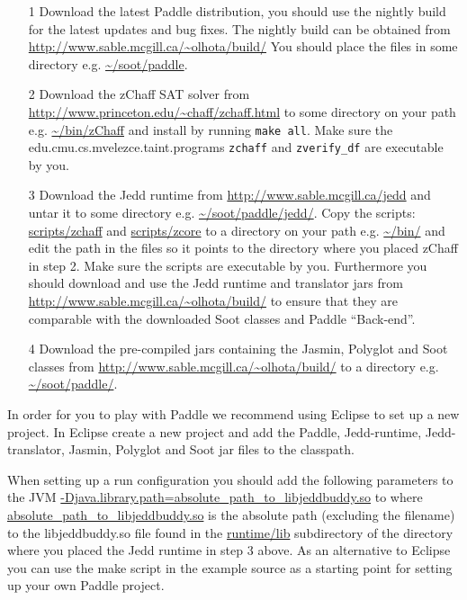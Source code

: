 \documentclass{article}
\newcommand{\code}[1]{\texttt{\small #1}}
\begin{document}
\begin{itemize}

\item[1] Download the latest Paddle distribution, you should use the
nightly build for the latest updates and bug fixes. The nightly build 
can be obtained from \url{http://www.sable.mcgill.ca/~olhota/build/}
You should place the files in some directory
e.g. \url{~/soot/paddle}.

\item[2] Download the zChaff SAT solver from \linebreak 
\url{http://www.princeton.edu/~chaff/zchaff.html} to some directory on
your path e.g. \url{~/bin/zChaff} and install by running \code{make
all}. Make sure the edu.cmu.cs.mvelezce.taint.programs \code{zchaff} and \code{zverify\_df} are
executable by you.

\item[3] Download the Jedd runtime from
\url{http://www.sable.mcgill.ca/jedd} and untar it to some directory
e.g. \url{~/soot/paddle/jedd/}. Copy the scripts: \url{scripts/zchaff}
and \url{scripts/zcore} to a directory on your path e.g. \url{~/bin/}
and edit the path in the files so it points to the directory where you
placed zChaff in step 2. Make sure the scripts are executable by you.
Furthermore you should download and use the Jedd runtime and translator
jars from \url{http://www.sable.mcgill.ca/~olhota/build/} to ensure
that they are comparable with the downloaded Soot classes and Paddle
``Back-end''.

\item[4] Download the pre-compiled jars containing the Jasmin,
Polyglot and Soot classes from
\url{http://www.sable.mcgill.ca/~olhota/build/} to a directory
e.g. \url{~/soot/paddle/}.

\end{itemize}

In order for you to play with Paddle we recommend using Eclipse to set
up a new project. In Eclipse create a new project and add the Paddle,
Jedd-runtime, Jedd-translator, Jasmin, Polyglot and Soot jar files to
the classpath.

When setting up a run configuration you should add the following
parameters to the JVM
\url{-Djava.library.path=absolute\_path\_to\_libjeddbuddy.so} to where
\url{absolute\_path\_to\_libjeddbuddy.so} is the absolute path
(excluding the filename) to the libjeddbuddy.so file found in the
\url{runtime/lib} subdirectory of the directory where you placed the
Jedd runtime in step 3 above. As an alternative to Eclipse you can use
the make script in the example source as a starting point for setting
up your own Paddle project.
\end{document}
